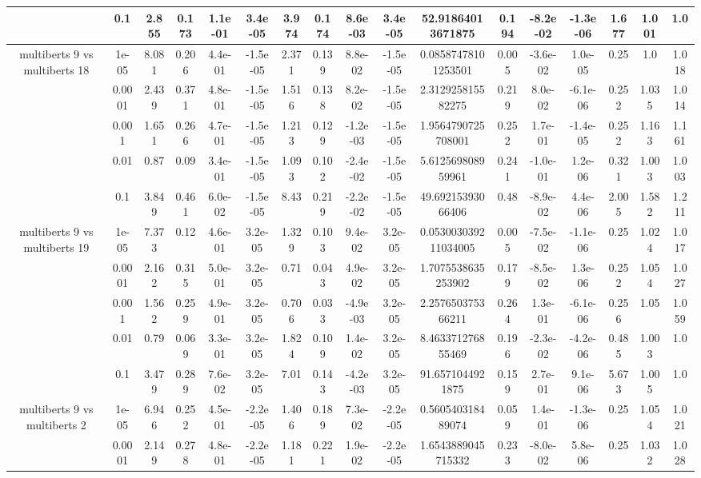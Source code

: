 \begin{tabular}{|c|c|c|c|c|c|c|c|c|c|c|c|c|c|c|c|c|}
 & 0.1 & 2.855 & 0.173 & 1.1e-01 & 3.4e-05 & 3.974 & 0.174 & 8.6e-03 & 3.4e-05 & 52.91864013671875 & 0.194 & -8.2e-02 & -1.3e-06 & 1.677 & 1.001 & 1.0 \\
\hline
\multirow{5}{*}{multiberts 9 vs multiberts 18} & 1e-05 & 8.081 & 0.206 & 4.4e-01 & -1.5e-05 & 2.371 & 0.139 & 8.8e-02 & -1.5e-05 & 0.08587478101253501 & 0.005 & -3.6e-02 & 1.0e-05 & 0.25 & 1.0 & 1.018 \\
 & 0.0001 & 2.439 & 0.371 & 4.8e-01 & -1.5e-05 & 1.516 & 0.138 & 8.2e-02 & -1.5e-05 & 2.312925815582275 & 0.219 & 8.0e-02 & -6.1e-06 & 0.252 & 1.035 & 1.014 \\
 & 0.001 & 1.651 & 0.266 & 4.7e-01 & -1.5e-05 & 1.213 & 0.129 & -1.2e-03 & -1.5e-05 & 1.9564790725708001 & 0.252 & 1.7e-01 & -1.4e-05 & 0.252 & 1.163 & 1.161 \\
 & 0.01 & 0.87 & 0.09 & 3.4e-01 & -1.5e-05 & 1.093 & 0.102 & -2.4e-02 & -1.5e-05 & 5.612569808959961 & 0.241 & -1.0e-01 & 1.2e-06 & 0.321 & 1.003 & 1.003 \\
 & 0.1 & 3.849 & 0.461 & 6.0e-02 & -1.5e-05 & 8.43 & 0.219 & -2.2e-02 & -1.5e-05 & 49.69215393066406 & 0.48 & -8.9e-02 & 4.4e-06 & 2.005 & 1.582 & 1.211 \\
\hline
\multirow{5}{*}{multiberts 9 vs multiberts 19} & 1e-05 & 7.373 & 0.12 & 4.6e-01 & 3.2e-05 & 1.329 & 0.103 & 9.4e-02 & 3.2e-05 & 0.053003039211034005 & 0.005 & -7.5e-02 & -1.1e-06 & 0.25 & 1.024 & 1.017 \\
 & 0.0001 & 2.162 & 0.315 & 5.0e-01 & 3.2e-05 & 0.71 & 0.043 & 4.9e-02 & 3.2e-05 & 1.7075538635253902 & 0.179 & -8.5e-02 & 1.3e-06 & 0.252 & 1.054 & 1.027 \\
 & 0.001 & 1.562 & 0.259 & 4.9e-01 & 3.2e-05 & 0.706 & 0.033 & -4.9e-03 & 3.2e-05 & 2.257650375366211 & 0.264 & 1.3e-01 & -6.1e-06 & 0.256 & 1.05 & 1.059 \\
 & 0.01 & 0.79 & 0.069 & 3.3e-01 & 3.2e-05 & 1.824 & 0.109 & 1.4e-02 & 3.2e-05 & 8.463371276855469 & 0.196 & -2.3e-02 & -4.2e-06 & 0.485 & 1.003 & 1.0 \\
 & 0.1 & 3.479 & 0.289 & 7.6e-02 & 3.2e-05 & 7.01 & 0.143 & -4.2e-03 & 3.2e-05 & 91.6571044921875 & 0.159 & 2.7e-01 & 9.1e-06 & 5.673 & 1.005 & 1.0 \\
\hline
\multirow{5}{*}{multiberts 9 vs multiberts 2} & 1e-05 & 6.946 & 0.252 & 4.5e-01 & -2.2e-05 & 1.406 & 0.189 & 7.3e-02 & -2.2e-05 & 0.560540318489074 & 0.059 & 1.4e-01 & -1.3e-06 & 0.25 & 1.054 & 1.021 \\
 & 0.0001 & 2.149 & 0.278 & 4.8e-01 & -2.2e-05 & 1.181 & 0.221 & 1.9e-02 & -2.2e-05 & 1.6543889045715332 & 0.233 & -8.0e-02 & 5.8e-06 & 0.25 & 1.032 & 1.028 \\

\end{tabular}
